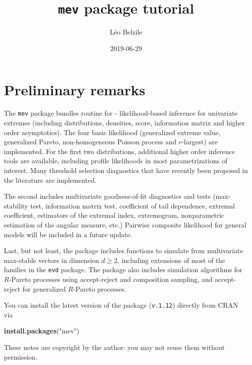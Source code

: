 \documentclass[]{book}
\title{\texttt{mev} package tutorial}
\author{Léo Belzile}
\date{2019-06-29}
\newenvironment{Shaded}{\begin{snugshade}}{\end{snugshade}}
\newcommand{\KeywordTok}[1]{\textcolor[rgb]{0.13,0.29,0.53}{\textbf{#1}}}
\newcommand{\NormalTok}[1]{#1}
\newcommand{\StringTok}[1]{\textcolor[rgb]{0.31,0.60,0.02}{#1}}
\begin{document}
\maketitle

{
\setcounter{tocdepth}{1}
\tableofcontents
}
\hypertarget{preliminary-remarks}{%
\chapter*{Preliminary remarks}\label{preliminary-remarks}}

The \texttt{mev} package bundles routine for
- likelihood-based inference for univariate extremes (including distributions, densities, score, information matrix and higher order asymptotics). The four basic likelihood (generalized extreme value, generalized Pareto, non-homogeneous Poisson process and \(r\)-largest) are implemented. For the first two distributions, additional higher order inference tools are available, including profile likelihoods in most parametrizations of interest. Many threshold selection diagnostics that have recently been proposed in the literature are implemented.

The second includes multivariate goodness-of-fit diagnostics and tests (max-stability test, information matrix test, coefficient of tail dependence, extremal coefficient, estimators of the extremal index, extremogram, nonparametric estimation of the angular measure, etc.) Pairwise composite likelihood for general models will be included in a future update.

Last, but not least, the package includes functions to simulate from multivariate max-stable vectors in dimension \(d\geq 2\), including extensions of most of the families in the \texttt{evd} package. The package also includes simulation algorithms for \(R\)-Pareto processes using accept-reject and composition sampling, and accept-reject for generalized \(R\)-Pareto processes.

You can install the latest version of the package (\texttt{v.1.12}) directly from CRAN via

\begin{Shaded}
\begin{Highlighting}[]
\KeywordTok{install.packages}\NormalTok{(}\StringTok{"mev"}\NormalTok{)}
\end{Highlighting}
\end{Shaded}

These notes are copyright by the author: you may not reuse them without permission.
\end{document}

